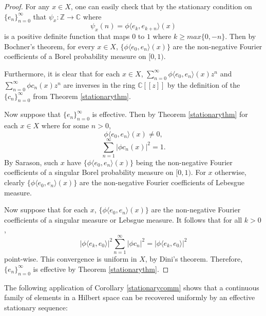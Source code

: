 \documentclass[11pt]{amsart}
\theoremstyle{definition}
\numberwithin{equation}{section}
\begin{document}
\begin{proof}
For any $x\in X$, one can easily check that by the stationary condition on $\{e_{n}\}_{n=0}^{\infty}$ that $\psi_{x}:\mathbb{Z}\to \mathbb{C}$ where $$\psi_{x}(n)=\phi\langle e_{k},e_{k+n}\rangle(x)$$ is a positive definite function that maps $0$ to $1$ where $k\geq max\{0,-n\}$. Then by Bochner's theorem, for every $x\in X$, $\{\phi \langle e_{0},e_{n}\rangle(x)\}$ are the non-negative Fourier coefficients of a Borel probability measure on $[0,1)$. 

Furthermore, it is clear that for each $x\in X$, $\sum_{n=0}^{\infty}\phi \langle e_{0},e_{n}\rangle(x)z^{n}$ and $\sum_{n=0}^{\infty}\phi c_{n}(x)z^{n}$ are inverses in the ring $\mathbb{C}[[z]]$ by the definition of the $\{c_{n}\}_{n=0}^{\infty}$ from Theorem \ref{stationarythm}.

Now suppose that $\{e_{n}\}_{n=0}^{\infty}$ is effective. Then by Theorem \ref{stationarythm} for each $x\in X$ where for some $n>0$, $$\phi \langle e_{0},e_{n}\rangle(x)\neq 0,$$
$$\sum_{n=1}^{\infty}|\phi c_{n}(x)|^{2}=1.$$ By Sarason, such $x$ have $\{\phi \langle e_{0},e_{n}\rangle(x)\}$ being the non-negative Fourier coefficients of a singular Borel probability measure on $[0,1)$. For $x$ otherwise, clearly $\{\phi \langle e_{0},e_{n}\rangle(x)\}$ are the non-negative Fourier coefficients of Lebesgue measure.

Now suppose that for each $x$, $\{\phi \langle e_{0},e_{n}\rangle(x)\}$ are the non-negative Fourier coefficients of a singular measure or Lebsgue measure. It follows that for all $k>0$,
$$|\phi \langle e_{k}, e_{0}\rangle|^{2} \sum_{n=1}^{\infty}|\phi c_{n}|^{2} =|\phi \langle e_{k}, e_{0}\rangle|^{2}$$ point-wise.
This convergence is uniform in $X$, by Dini's theorem. Therefore, $\{e_{n}\}_{n=0}^{\infty}$ is effective by Theorem \ref{stationarythm}.
\end{proof}

The following application of Corollary \ref{stationarycomm} shows that a continuous family of elements in a Hilbert space can be recovered uniformly by an effective stationary sequence:
\end{document}
